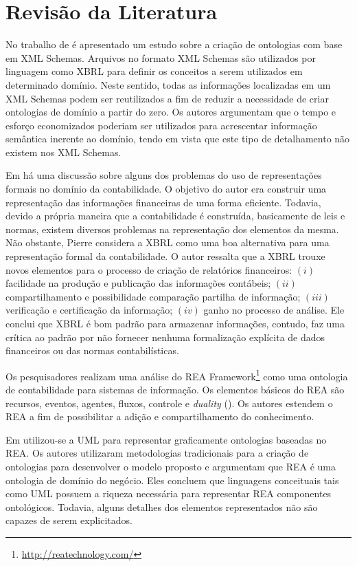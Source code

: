 \documentclass[msc,proposal,hidelot,hideabstract]{ppgccufmg} %
\begin{document}
\chapter{Revisão da Literatura}
\label{ch:revisao}

No trabalho de \cite{Bosch:2013:APD:2575980.2575988} é apresentado um estudo sobre a criação de ontologias com base em XML Schemas. Arquivos no formato XML Schemas são utilizados por linguagem como XBRL para definir os conceitos a serem utilizados em determinado domínio. Neste sentido, todas as informações localizadas em um XML Schemas podem ser reutilizados a fim de reduzir a necessidade de criar ontologias de domínio a partir do zero. Os autores argumentam que o tempo e esforço economizados poderiam ser utilizados para acrescentar informação semântica inerente ao domínio, tendo em vista que este tipo de detalhamento não existem nos XML Schemas.

Em \cite{journals/ijcsa/Pierre08} há uma discussão sobre alguns dos problemas do uso de representações formais no domínio da contabilidade. O objetivo do autor era construir uma representação das informações financeiras de uma forma eficiente. Todavia, devido a própria maneira que a contabilidade é construída, basicamente de leis e normas, existem diversos problemas na representação dos elementos da mesma. Não obstante, Pierre considera a XBRL como uma boa alternativa para uma representação formal da contabilidade. O autor ressalta que a XBRL trouxe novos elementos para o processo de criação de relatórios financeiros: $(i)$ facilidade na produção e publicação das informações contábeis; $(ii)$ compartilhamento e possibilidade comparação partilha de informação; $(iii)$ verificação e certificação da informação; $(iv)$ ganho no processo de análise. Ele conclui que XBRL é bom padrão para armazenar informações, contudo, faz uma crítica ao padrão por não fornecer nenhuma formalização explícita de dados financeiros ou das normas contabilísticas.

Os pesquisadores \cite{lupacsc2010role} realizam uma análise do REA Framework\footnote{\url{http://reatechnology.com/}} como uma ontologia de contabilidade para sistemas de informação. Os elementos básicos do REA são recursos, eventos, agentes, fluxos, controle e \textit{duality} (\cite{mccarthy1982rea}). Os autores estendem o REA a fim de possibilitar a adição e compartilhamento do conhecimento.

Em \cite{gailly2007positioning} utilizou-se a UML para representar graficamente ontologias baseadas no REA. Os autores utilizaram metodologias tradicionais para a criação de ontologias para desenvolver o modelo proposto e argumentam que REA é uma ontologia de domínio do negócio. Eles concluem que linguagens conceituais tais como UML possuem a riqueza necessária para representar REA componentes ontológicos. Todavia, alguns detalhes dos elementos representados não são capazes de serem explicitados.
\end{document}
